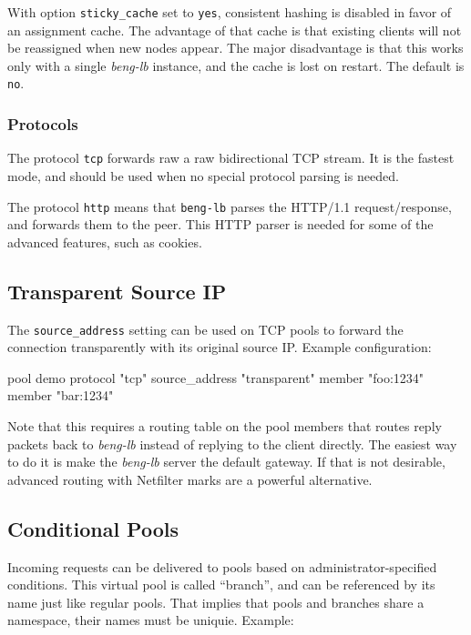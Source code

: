 \documentclass[a4paper,12pt]{article}
\begin{document}
With option \verb|sticky_cache| set to \verb|yes|, consistent hashing
is disabled in favor of an assignment cache.  The advantage of that
cache is that existing clients will not be reassigned when new nodes
appear.  The major disadvantage is that this works only with a single
\emph{beng-lb} instance, and the cache is lost on restart.  The
default is \verb|no|.

\subsubsection{Protocols}

The protocol \texttt{tcp} forwards raw a raw bidirectional TCP stream.
It is the fastest mode, and should be used when no special protocol
parsing is needed.

The protocol \texttt{http} means that \texttt{beng-lb} parses the
HTTP/1.1 request/response, and forwards them to the peer.  This HTTP
parser is needed for some of the advanced features, such as cookies.

\subsection{Transparent Source IP}

The \verb|source_address| setting can be used on TCP pools to forward
the connection transparently with its original source IP.  Example
configuration:

\begin{verbatim*}
pool demo {
  protocol "tcp"
  source_address "transparent"
  member "foo:1234"
  member "bar:1234"
}
\end{verbatim*}

Note that this requires a routing table on the pool members that
routes reply packets back to \emph{beng-lb} instead of replying to the
client directly.  The easiest way to do it is make the \emph{beng-lb}
server the default gateway.  If that is not desirable, advanced
routing with Netfilter marks are a powerful alternative.

\subsection{Conditional Pools}

Incoming requests can be delivered to pools based on
administrator-specified conditions.  This virtual pool is called
``branch'', and can be referenced by its name just like regular pools.
That implies that pools and branches share a namespace, their names
must be uniquie.  Example:
\end{document}
